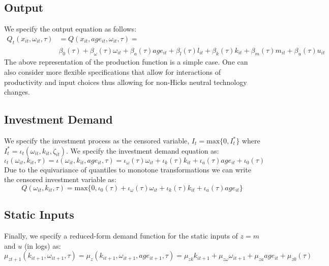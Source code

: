 \documentclass{article}
\begin{document}
\subsection{Output}
We specify the output equation as follows:
\begin{equation}\label{ymodel}
\begin{split}
Q_{t}(x_{it}, \omega_{it}, \tau)&=Q(x_{it}, age_{it}, \omega_{it}, \tau)=\\
&\beta_{0}(\tau)+\beta_{\omega}(\tau)\omega_{it}+\beta_{a}(\tau)age_{it}+\beta_{l}(\tau)l_{it}+\beta_{k}(\tau)k_{it}+\beta_{m}(\tau)m_{it}+\beta_{u}(\tau)u_{it}
\end{split}
\end{equation}
The above representation of the production function is a simple case. One can also consider more flexible specifications that allow for interactions of productivity and input choices thus allowing for non-Hicks neutral technology changes.

\subsection{Investment Demand}
We specify the investment process as the censored variable, $I_{t}=\text{max}\{0, I^{*}_{t}\}$ where $I_{t}^{*}=\iota_{t}(\omega_{it}, k_{it}, \zeta_{it})$. We specify the investment demand equation as:
\begin{equation}\label{imodel}
\iota_{t}(\omega_{it}, k_{it}, \tau)=\iota(\omega_{it}, k_{it}, age_{it}, \tau)=\iota_{\omega}(\tau)\omega_{it}+\iota_{k}(\tau)k_{it}+\iota_{a}(\tau)age_{it}+\iota_{0}(\tau)
\end{equation}
Due to the equivariance of quantiles to monotone transformations we can write the censored investment variable as:
\begin{equation}\label{censormodel}
Q(\omega_{it}, k_{it}, \tau)=\text{max}\{0, \iota_{0}(\tau)+\iota_{\omega}(\tau)\omega_{it}+\iota_{k}(\tau)k_{it}+\iota_{a}(\tau)age_{it}\}
\end{equation}

\subsection{Static Inputs}
Finally, we specify a reduced-form demand function for the static inputs of $z=m$ and $u$ (in logs) as:
\begin{equation}\label{staticmodel}
\mu_{zt+1}(k_{it+1}, \omega_{it+1}, \tau)=\mu_{z}(k_{it+1}, \omega_{it+1}, age_{it+1}, \tau)=\mu_{zk}k_{it+1}+\mu_{z\omega}\omega_{it+1}+\mu_{za}age_{it}+\mu_{z0}(\tau)
\end{equation}
\end{document}
